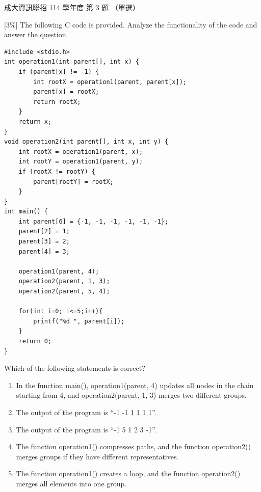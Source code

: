 \begin{pastexam}[label={px:ncku-114-prog-03}]{成大資訊聯招 114 學年度 第 3 題}
（單選）

{[3\%]} The following C code is provided. Analyze the functionality of the code and answer the question.
\begin{verbatim}
#include <stdio.h>
int operation1(int parent[], int x) {
    if (parent[x] != -1) {
        int rootX = operation1(parent, parent[x]);
        parent[x] = rootX;
        return rootX;
    }
    return x;
}
void operation2(int parent[], int x, int y) {
    int rootX = operation1(parent, x);
    int rootY = operation1(parent, y);
    if (rootX != rootY) {
        parent[rootY] = rootX;
    }
}
int main() {
    int parent[6] = {-1, -1, -1, -1, -1, -1};
    parent[2] = 1;
    parent[3] = 2;
    parent[4] = 3;

    operation1(parent, 4);
    operation2(parent, 1, 3);
    operation2(parent, 5, 4);

    for(int i=0; i<=5;i++){
        printf("%d ", parent[i]);
    }
    return 0;
}
\end{verbatim}
Which of the following statements is correct?
\begin{enumerate}[label=(\Alph*)]
\item In the function main(), operation1(parent, 4) updates all nodes in the chain starting from 4, and operation2(parent, 1, 3) merges two different groups.
\item The output of the program is ``-1 -1 1 1 1 1''.
\item The output of the program is ``-1 5 1 2 3 -1''.
\item The function operation1() compresses paths, and the function operation2() merges groups if they have different representatives.
\item The function operation1() creates a loop, and the function operation2() merges all elements into one group.
\end{enumerate}
\end{pastexam}

